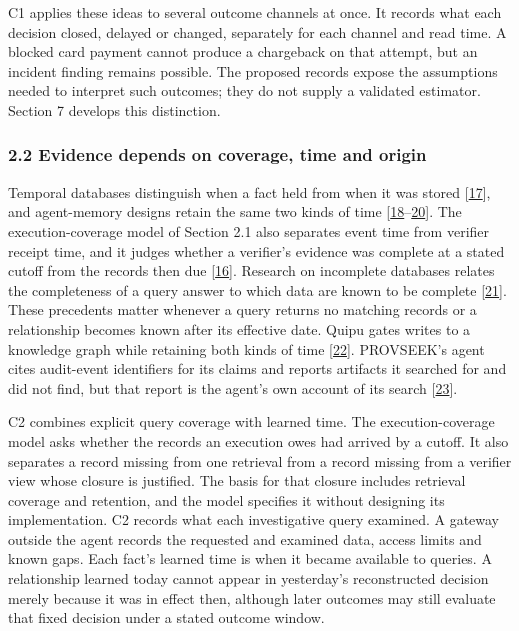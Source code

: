 \documentclass[
  11pt,
]{article}
\begin{document}
C1 applies these ideas to several outcome channels at once. It records
what each decision closed, delayed or changed, separately for each
channel and read time. A blocked card payment cannot produce a
chargeback on that attempt, but an incident finding remains possible.
The proposed records expose the assumptions needed to interpret such
outcomes; they do not supply a validated estimator. Section 7 develops
this distinction.

\hypertarget{evidence-depends-on-coverage-time-and-origin}{%
\subsubsection{2.2 Evidence depends on coverage, time and
origin}\label{evidence-depends-on-coverage-time-and-origin}}

Temporal databases distinguish when a fact held from when it was stored
{[}\protect\hyperlink{ref-Snodgrass1986Temporal}{17}{]}, and
agent-memory designs retain the same two kinds of time
{[}\protect\hyperlink{ref-Wang2026TOKI}{18}--\protect\hyperlink{ref-Dan2026Anamnesis}{20}{]}.
The execution-coverage model of Section 2.1 also separates event time
from verifier receipt time, and it judges whether a verifier's evidence
was complete at a stated cutoff from the records then due
{[}\protect\hyperlink{ref-Wu2026EvidenceCoverage}{16}{]}. Research on
incomplete databases relates the completeness of a query answer to which
data are known to be complete
{[}\protect\hyperlink{ref-Razniewski2011Completeness}{21}{]}. These
precedents matter whenever a query returns no matching records or a
relationship becomes known after its effective date. Quipu gates writes
to a knowledge graph while retaining both kinds of time
{[}\protect\hyperlink{ref-Brown2026Quipu}{22}{]}. PROVSEEK's agent cites
audit-event identifiers for its claims and reports artifacts it searched
for and did not find, but that report is the agent's own account of its
search {[}\protect\hyperlink{ref-Mukherjee2025PROVSEEK}{23}{]}.

C2 combines explicit query coverage with learned time. The
execution-coverage model asks whether the records an execution owes had
arrived by a cutoff. It also separates a record missing from one
retrieval from a record missing from a verifier view whose closure is
justified. The basis for that closure includes retrieval coverage and
retention, and the model specifies it without designing its
implementation. C2 records what each investigative query examined. A
gateway outside the agent records the requested and examined data,
access limits and known gaps. Each fact's learned time is when it became
available to queries. A relationship learned today cannot appear in
yesterday's reconstructed decision merely because it was in effect then,
although later outcomes may still evaluate that fixed decision under a
stated outcome window.
\end{document}
